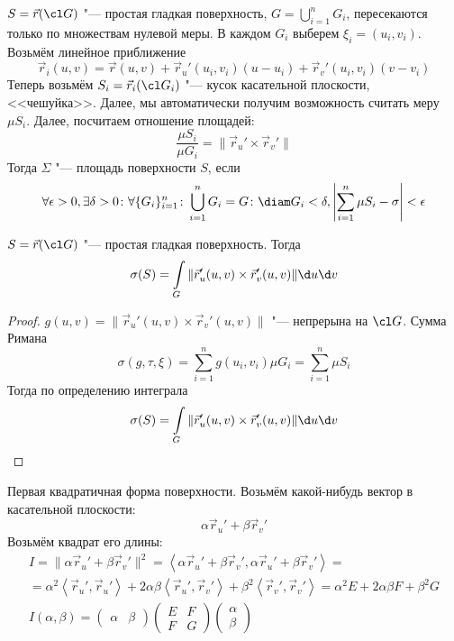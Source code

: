 \begin{Def}
	$S = \vec r(\cl G)$ "--- простая гладкая поверхность, $G = \bigcup_{i=1}^n G_i$, пересекаются только по множествам нулевой меры.
	В каждом $G_i$ выберем $\xi_i = (u_i, v_i)$.
	Возьмём линейное приближение
	\[ \vec r_i(u, v) = \vec r(u, v) + \vec r_u' (u_i, v_i)(u - u_i) + \vec r_v'(u_i, v_i)(v - v_i) \]
	Теперь возьмём $S_i = \vec r_i(\cl G_i)$ "--- кусок касательной плоскости, <<чешуйка>>.
	Далее, мы автоматически получим возможность считать меру $\mu S_i$.
	Далее, посчитаем отношение площадей:
	\[ \frac{\mu S_i}{\mu G_i} = \|\vec r_u' \times \vec r_v' \| \]
	Тогда $\Sigma$ "--- площадь поверхности $S$, если
	\[
		\forall \epsilon > 0, \exists \delta > 0\colon \forall \{G_i\}_{i=1}^n\colon \bigcup_{i=1}^n G_i = G\colon
		\diam G_i < \delta, \left| \sum_{i=1}^n \mu S_i - \sigma \right| < \epsilon
	\]
\end{Def}

\begin{theorem}
	$S = \vec r(\cl G)$ "--- простая гладкая поверхность.
	Тогда
	\[ \sigma(S) = \int\limits_{G} \|\vec r_u'(u, v) \times \vec r_v'(u, v)\| \d u \d v \]
\end{theorem}
\begin{proof}
	$g(u, v) = \|\vec r_u'(u, v) \times \vec r_v'(u, v)\|$ "--- непрерына на $\cl G$.
	Сумма Римана
	\[
		\sigma(g, \tau, \xi) = \sum_{i=1}^n g(u_i, v_i) \mu G_i = \sum_{i=1}^n \mu S_i
	\]
	Тогда по определению интеграла
	\[ \sigma(S) = \int\limits_{G} \|\vec r_u'(u, v) \times \vec r_v'(u, v)\| \d u \d v \]
\end{proof}

\begin{Def}
	Первая квадратичная форма поверхности.
	Возьмём какой-нибудь вектор в касательной плоскости:
	\[ \alpha \vec r_u' + \beta \vec r_v' \]
	Возьмём квадрат его длины:
	\begin{gather*}
		I = \|\alpha \vec r_u' + \beta \vec r_v'\|^2
		= \left<\alpha \vec r_u' + \beta \vec r_v',\alpha \vec r_u' + \beta \vec r_v'\right> = \\
		= \alpha^2 \left<\vec r_u', \vec r_u'\right> + 2\alpha\beta \left<\vec r_u', \vec r_v'\right> + \beta^2 \left<\vec r_v', \vec r_v'\right>
		= \alpha^2 E + 2\alpha\beta F + \beta^2 G \\
		I(\alpha, \beta)
		= \begin{pmatrix} \alpha & \beta \end{pmatrix} \begin{pmatrix} E & F \\ F & G \end{pmatrix} \begin{pmatrix} \alpha\\\beta \end{pmatrix}
	\end{gather*}
\end{Def}


